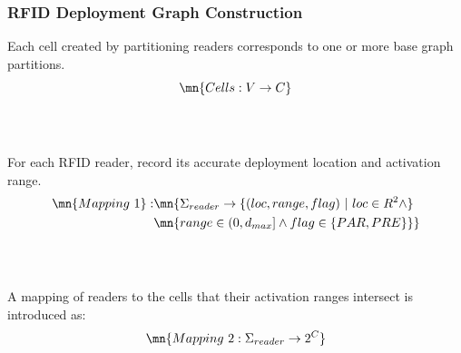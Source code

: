 \begin{frame}
\begin{columns}[c]
\end{columns}
\end{frame}


\begin{frame}
\frametitle{RFID Deployment Graph Construction}

  \small{Each cell created by partitioning readers corresponds to one or more base graph partitions.}
  \pause
  \begin{equation}
  \mn{Cells: V \rightarrow C}
  \end{equation}
  \\~\\
  \pause

  \small{For each RFID reader, record its accurate deployment location and activation range.}
  \pause
  \begin{equation}
  \begin{split}
  \mn{Mapping~1}: & \mn{\Sigma_{reader} \rightarrow \{ (loc, range, flag)~|~loc \in R^2 \wedge} \\
    & \mn{range \in (0,d_{max}] \wedge flag \in \{ PAR, PRE \} \}}
  \end{split}
  \end{equation}
  \\~\\
  \pause

  \small{A mapping of readers to the cells that their activation ranges intersect is introduced as:}
  \pause
  \begin{equation}
  \mn{
  Mapping~2: \Sigma_{reader} \rightarrow 2^C
  }
  \end{equation}

\end{frame}


